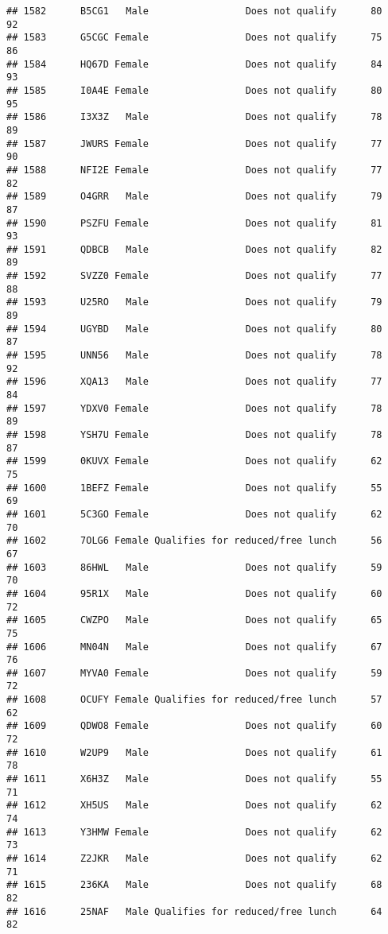 \documentclass[
]{article}
\begin{document}
\begin{verbatim}
## 1582      B5CG1   Male                 Does not qualify      80       92
## 1583      G5CGC Female                 Does not qualify      75       86
## 1584      HQ67D Female                 Does not qualify      84       93
## 1585      I0A4E Female                 Does not qualify      80       95
## 1586      I3X3Z   Male                 Does not qualify      78       89
## 1587      JWURS Female                 Does not qualify      77       90
## 1588      NFI2E Female                 Does not qualify      77       82
## 1589      O4GRR   Male                 Does not qualify      79       87
## 1590      PSZFU Female                 Does not qualify      81       93
## 1591      QDBCB   Male                 Does not qualify      82       89
## 1592      SVZZ0 Female                 Does not qualify      77       88
## 1593      U25RO   Male                 Does not qualify      79       89
## 1594      UGYBD   Male                 Does not qualify      80       87
## 1595      UNN56   Male                 Does not qualify      78       92
## 1596      XQA13   Male                 Does not qualify      77       84
## 1597      YDXV0 Female                 Does not qualify      78       89
## 1598      YSH7U Female                 Does not qualify      78       87
## 1599      0KUVX Female                 Does not qualify      62       75
## 1600      1BEFZ Female                 Does not qualify      55       69
## 1601      5C3GO Female                 Does not qualify      62       70
## 1602      7OLG6 Female Qualifies for reduced/free lunch      56       67
## 1603      86HWL   Male                 Does not qualify      59       70
## 1604      95R1X   Male                 Does not qualify      60       72
## 1605      CWZPO   Male                 Does not qualify      65       75
## 1606      MN04N   Male                 Does not qualify      67       76
## 1607      MYVA0 Female                 Does not qualify      59       72
## 1608      OCUFY Female Qualifies for reduced/free lunch      57       62
## 1609      QDWO8 Female                 Does not qualify      60       72
## 1610      W2UP9   Male                 Does not qualify      61       78
## 1611      X6H3Z   Male                 Does not qualify      55       71
## 1612      XH5US   Male                 Does not qualify      62       74
## 1613      Y3HMW Female                 Does not qualify      62       73
## 1614      Z2JKR   Male                 Does not qualify      62       71
## 1615      236KA   Male                 Does not qualify      68       82
## 1616      25NAF   Male Qualifies for reduced/free lunch      64       82

\end{verbatim}
\end{document}
